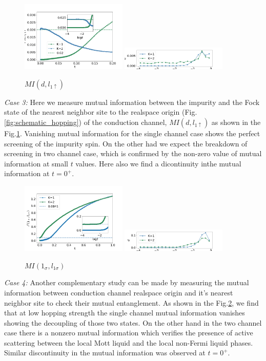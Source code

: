 \documentclass[reprint,prb,superscriptaddress]{revtex4-2}
\begin{document}
\begin{figure}
\includegraphics[width=0.45\textwidth]{plt/A_I2_ch12_['d','l1_up']}
\includegraphics[width=0.45\textwidth]{plt/errorbar_A_I2_ch12_['d','l1_up']}
\caption{$MI(d,l_{1\uparrow})$}
\label{fig:MI_d_l1}
\end{figure}
\par \textit{Case 3:} Here we measure mutual information between the impurity and the Fock state of the nearest neighbor site to the realspace origin (Fig.\ref{fig:schematic_hopping}) of the conduction channel, $MI(d,l_{1\uparrow})$ as shown in the Fig.\ref{fig:MI_d_l1}. Vanishing mutual information for the single channel case shows the perfect screening of the impurity spin. On the other had we expect the breakdown of screening in two channel case, which is confirmed by the non-zero value of mutual information at small $t$ values. Here also we find a dicontinuity inthe mutual information at $t=0^+$.


\begin{figure}[!htpb]
\includegraphics[width=0.45\textwidth]{plt/A_I2_ch12_['1','l1']}
\includegraphics[width=0.45\textwidth]{plt/errorbar_A_I2_ch12_['1','l1']}
\caption{$MI(1_{\sigma},l_{1\sigma})$}
\label{fig:MI_l_l1}
\end{figure}

\par \textit{Case 4:} Another complementary study can be made by measuring the mutual information between conduction channel realspace origin and it's nearest neighbor site to check their mutual entanglement. As shown in the Fig.\ref{fig:MI_l_l1}, we find that at low hopping strength the single channel mutual information vanishes showing the decoupling of those two states. On the other hand in the two channel case there is a nonzero mutual information which verifies the presence of active scattering between the local Mott liquid and the local non-Fermi liquid phases. Similar discontinuity in the mutual information was observed at $t=0^+$.
\end{document}
